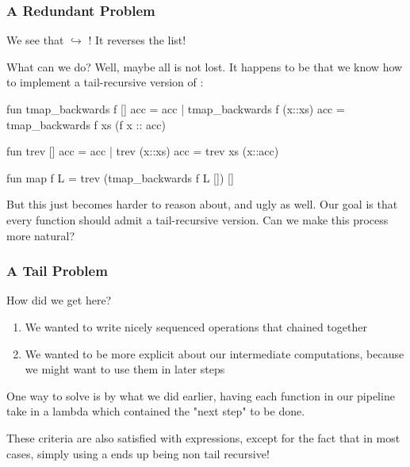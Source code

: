 \documentclass[aspectratio=169]{beamer}
\begin{document}
\begin{frame}[fragile]
  \frametitle{A Redundant Problem}

  We see that  $\hookrightarrow$
  \code{["3", "2", "1"]}! It reverses the list!

  \pause
  \vspace{\fill}

  What can we do? Well, maybe all is not lost. It happens to be that
  we know how to implement a tail-recursive version of :

  {\small
  \begin{codeblock}
    fun tmap_backwards f [] acc = acc
      | tmap_backwards f (x::xs) acc =
          tmap_backwards f xs (f x :: acc)

    fun trev [] acc = acc
      | trev (x::xs) acc = trev xs (x::acc)

    fun map f L = trev (tmap_backwards f L []) []
  \end{codeblock}
  }

  \pause
  \vspace{\fill}

  But this just becomes harder to reason about, and ugly as well. Our goal
  is that every function should admit a tail-recursive version. Can we
  make this process more natural?
\end{frame}

\begin{frame}[fragile]
  \frametitle{A Tail Problem}

  How did we get here?

  \pause
  \vspace{\fill}

  \begin{enumerate}
    \item We wanted to write nicely sequenced operations that chained together
    \item We wanted to be more explicit about our intermediate computations, because
    we might want to use them in later steps
  \end{enumerate}

  \pause
  \vspace{\fill}

  One way to solve is by what we did earlier, having each function in our pipeline
  take in a lambda which contained the "next step" to be done.

  \pause
  \vspace{\fill}

  These criteria are also satisfied with  expressions, except for the
  fact that in most cases, simply using a  ends up being non
  tail recursive!

  \pause
  \vspace{\fill}

\end{frame}
\end{document}
